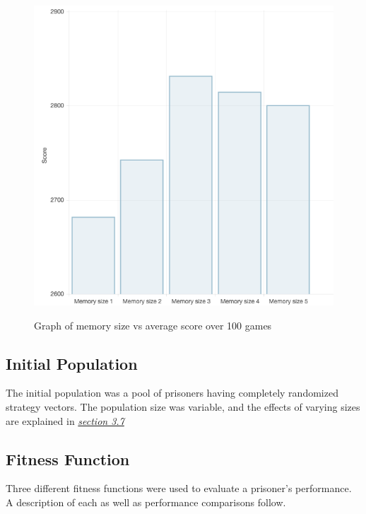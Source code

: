 \documentclass[12pt]{article}
\begin{document}
\begin{figure}[h]
    \centering
    \includegraphics[scale=0.6]{figures/memsize-vs-score.png}
    \label{fig1}
    \caption{Graph of memory size vs average score over 100 games}
\end{figure}

\subsection{Initial Population}
The initial population was a pool of prisoners having completely randomized
strategy vectors.  The population size was variable, and the effects of varying
sizes are explained in \textit{\hyperref[vpg]{section 3.7}}

\subsection{Fitness Function}

Three different fitness functions were used to evaluate a prisoner's performance.
A description of each as well as performance comparisons follow.
\end{document}
